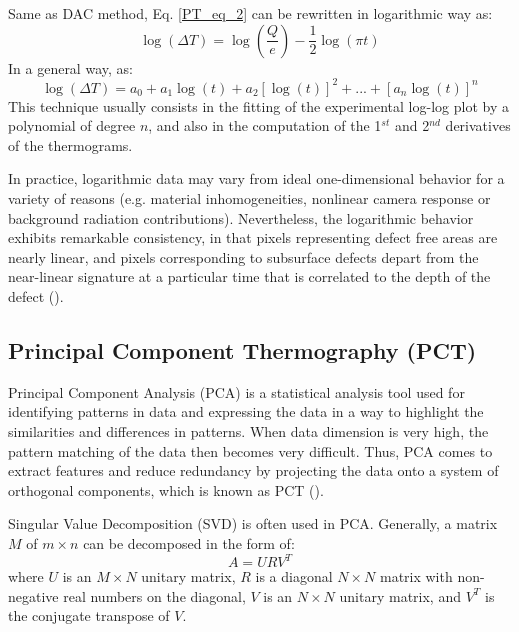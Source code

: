 Same as DAC method, Eq. \ref{PT_eq_2} can be rewritten  in logarithmic way as:
\begin{equation}
\log (\Delta T) = \log (\frac{Q}{e}) - \frac{1}{2}\log (\pi t)
\end{equation}
In a general way, as: %
\begin{equation}
\log (\Delta T) = a_0 + a_1\log (t) + a_2[\log (t)]^2 +...+ [a_n\log(t)]^n
\end{equation}
This technique usually consists in the fitting of the experimental log-log plot by a polynomial of degree $n$, and also in the computation of the 1$^{st}$ and 2$^{nd}$ derivatives of the thermograms.

In practice, logarithmic data may vary from ideal one-dimensional behavior for a variety of reasons (e.g. material inhomogeneities, nonlinear camera response or background radiation contributions). Nevertheless, the logarithmic behavior exhibits remarkable consistency, in that pixels representing defect free areas are nearly linear, and pixels corresponding to subsurface defects depart from the near-linear signature at a particular time that is correlated to the depth of the defect (\citet{Shepard2002,Shepard2003}).


\subsection{Principal Component Thermography (PCT)}
Principal Component Analysis (PCA) is a statistical analysis tool used for identifying patterns in data and expressing the data in a way to highlight the similarities and differences in patterns. When data dimension is very high, the pattern matching of the data then becomes very difficult. Thus, PCA comes to extract features and reduce redundancy by projecting the data onto a system of orthogonal components, which is known as PCT (\citet{Rajic2002,Rajic2002a}). 

Singular Value Decomposition (SVD) is often used in PCA. Generally, a matrix $M$ of $m\times n$ can be decomposed in the form of:
\begin{equation}
A = U R V^T
\end{equation}
where $U$ is an $M\times N$ unitary matrix, $R$ is a diagonal $N \times N$ matrix with non-negative real numbers on the diagonal, $V$ is an $N\times N$ unitary matrix, and $V^T$ is the conjugate transpose of $V$.

